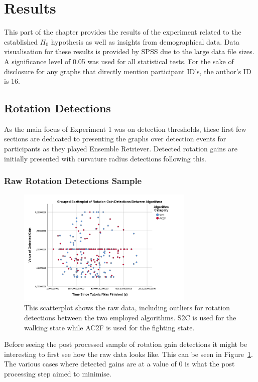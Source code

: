 \section{Results}\label{sec:ex1results}
This part of the chapter provides the results of the experiment related to the established $H_0$ hypothesis as well as insights from demographical data. Data visualisation for these results is provided by SPSS due to the large data file sizes. A significance level of 0.05 was used for all statistical tests. For the sake of disclosure for any graphs that directly mention participant ID's, the author's ID is 16. 

\subsection{Rotation Detections}
As the main focus of Experiment 1 was on detection thresholds, these first few sections are dedicated to presenting the graphs over detection events for participants as they played Ensemble Retriever. Detected rotation gains are initially presented with curvature radius detections following this.

\subsubsection{Raw Rotation Detections Sample}
\begin{figure}[tbph]
    \centering
    \includegraphics[width=0.75\textwidth]{figures/graphs/RawRotationDetections.png}
    \caption[Raw Detection Scatterplot For Rotation Gains]{This scatterplot shows the raw data, including outliers for rotation detections between the two employed algorithms. S2C is used for the walking state while AC2F is used for the fighting state.}
    \label{fig:rawRotationDetectionData}
\end{figure}

Before seeing the post processed sample of rotation gain detections it might be interesting to first see how the raw data looks like. This can be seen in Figure~\ref{fig:rawRotationDetectionData}. The various cases where detected gains are at a value of 0 is what the post processing step aimed to minimise. 


